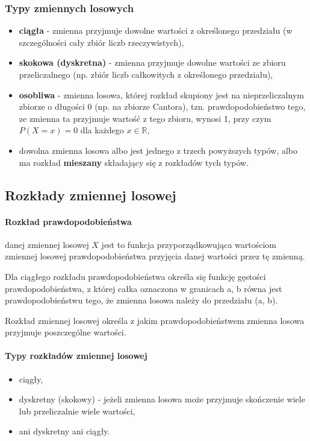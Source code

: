\documentclass[a4paper,twoside]{report}
\begin{document}
\subsubsection{Typy zmiennych losowych}
\begin{itemize}
\item \textbf{ciągła} - zmienna przyjmuje dowolne wartości z określonego przedziału (w szczególności cały zbiór liczb rzeczywistych),
\item \textbf{skokowa (dyskretna)} - zmienna przyjmuje dowolne wartości ze zbioru przeliczalnego (np. zbiór liczb całkowitych z określonego przedziału),
\item \textbf{osobliwa} - zmienna losowa, której rozkład skupiony jest na nieprzeliczalnym zbiorze o długości 0 (np. na zbiorze Cantora), tzn. prawdopodobieństwo tego, ze zmienna ta przyjmuje wartość z tego zbioru, wynosi 1, przy czym $P(X = x) = 0$ dla każdego $x \in \mathbb{R}$,
\item dowolna zmienna losowa albo jest jednego z trzech powyższych typów, albo ma rozkład \textbf{mieszany} składający się z rozkładów tych typów.
\end{itemize}

\subsection{Rozkłady zmiennej losowej}
\paragraph{Rozkład prawdopodobieństwa} danej zmiennej losowej $X$ jest to funkcja przyporządkowująca wartościom zmiennej losowej prawdopodobieństwa przyjęcia danej wartości przez tę zmienną.

Dla ciągłego rozkładu prawdopodobieństwa określa się funkcję gęstości prawdopodobieństwa, z której całka oznaczona w granicach a, b równa jest prawdopodobieństwu tego, że zmienna losowa należy do przedziału (a, b).

Rozkład zmiennej losowej określa z jakim prawdopodobieństwem zmienna losowa przyjmuje poszczególne wartości. 

\paragraph{Typy rozkładów zmiennej losowej}
\begin{itemize}
\item ciągły,
\item dyskretny (skokowy) - jeżeli zmienna losowa może przyjmuje skończenie wiele lub przeliczalnie wiele wartości,
\item ani dyskretny ani ciągły.
\end{itemize}
\end{document}
